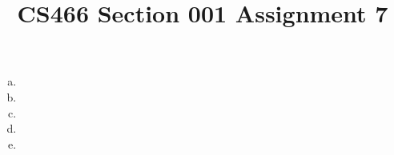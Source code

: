 \documentclass[12pt]{article}
\title{CS466 Section 001 Assignment 7}
\begin{document}
\maketitle

\begin{enumerate}[(a)]
\item
\item
\item
\item
\item
\end{enumerate}
\end{document}
